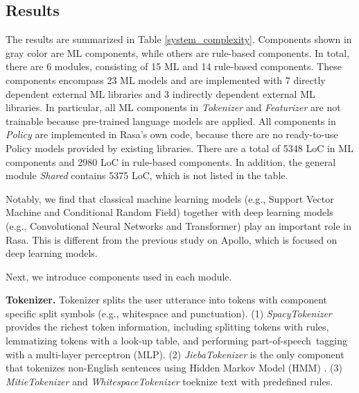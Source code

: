 


\subsection{Results}

The results are summarized in Table \ref{system_complexity}.
Components shown in gray color are ML components, while others are rule-based components. In total,
there are 6 modules, consisting of 15 ML and 14 rule-based components. These components encompass 23 ML models and are implemented with 7 directly dependent external ML libraries and 3 indirectly dependent external ML libraries. In particular, all ML components in \textit{Tokenizer} and \textit{Featurizer} are not trainable because pre-trained language models are applied. All components in \textit{Policy} are implemented in Rasa's own code, because there are no ready-to-use Policy models provided by existing libraries. There are a total of 5348 LoC in ML components and 2980 LoC in rule-based components. In addition, the general module \textit{Shared} contains 5375 LoC, which is not listed in the table.

Notably, we find that classical machine learning models (e.g., Support Vector Machine and Conditional Random Field) together with deep learning models (e.g., Convolutional Neural Networks and Transformer) play an important role in Rasa. This is different from the previous study \cite{pengFirstLookIntegration2020} on Apollo, which is focused on deep learning models.


Next, we introduce components used in each module.

\textbf{Tokenizer.} Tokenizer splits the user utterance into tokens with component specific split symbols (e.g., whitespace and punctuation). (1) \textit{SpacyTokenizer} provides the richest token information, including splitting tokens with rules, lemmatizing tokens with a look-up table, and performing part-of-speech~tagging with a multi-layer perceptron (MLP). 
(2) \textit{JiebaTokenizer} is the only component that tokenizes non-English sentences using Hidden Markov Model (HMM) \cite{eddy1996hidden}. (3) \textit{MitieTokenizer} and \textit{WhitespaceTokenizer} toeknize text with predefined rules.

